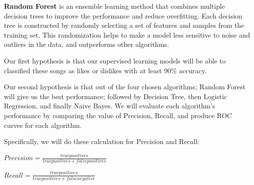 \textbf{Random Forest} is an ensemble learning method that combines multiple decision trees to improve the performance and reduce overfitting. Each decision tree is constructed by randomly selecting a set of features and samples from the training set. 
This randomization helps to make a model less sensitive to noise and outliers in the data, and outperforms other algorithms. 

Our first hypothesis is that our supervised learning models will be able to classified these songs as likes or dislikes with at least 90\% accuracy.

Our second hypothesis is that out of the four chosen algorithms; Random Forest will give us the best performance; followed by Decision Tree, then Logistic Regression, and finally Naive Bayes.
We will evaluate each algorithm's performance by comparing the value of Precision, Recall, and produce ROC curves for each algorithm.

Specifically, we will do these calculation for Precision and Recall:

$Precision = \frac{true positives}{true positives + false positives}$

$Recall = \frac{true positives}{true positives + false negative}$